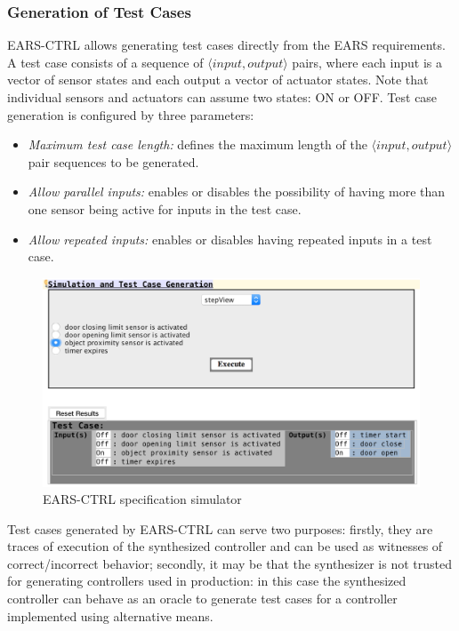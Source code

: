 \subsubsection{Generation of Test Cases}
\textsf{EARS-CTRL} allows generating test cases directly from the EARS
requirements. A test case consists of a sequence of $\langle
input, output \rangle$ pairs, where each input is a vector of sensor states
and each output a vector of actuator states. Note that individual sensors and
actuators can assume two states: \textsf{ON} or \textsf{OFF}. Test case
generation is configured by three parameters:\vspace{-.1cm}
\begin{itemize}
  \item \emph{Maximum test case length:} defines the maximum length of the
  $\langle input, output \rangle$ pair sequences to be generated.
  \item \emph{Allow parallel inputs:} enables or disables the possibility of
  having more than one sensor being active for inputs in the test case.
  \item \emph{Allow repeated inputs:} enables or disables having repeated inputs
  in a test case.\vspace{-.3cm} 
\end{itemize}
\begin{figure}[h!]
   \begin{center}
     \includegraphics[width=.75\textwidth]{images/simulation.png}
     \vspace{-.3cm}
     \caption{\textsf{EARS-CTRL} specification simulator}
     \label{fig:ears_simulator} 
   \end{center}
   \vspace{-1cm}
 \end{figure}
Test cases generated by \textsf{EARS-CTRL} can serve two purposes: firstly, they
are traces of execution of the synthesized controller and can be used as
witnesses of correct/incorrect behavior; secondly, it may be that the
synthesizer is not trusted for generating controllers used in production:
in this case the synthesized controller can behave as an oracle to generate test
cases for a controller implemented using alternative means.\vspace{-.5cm}
